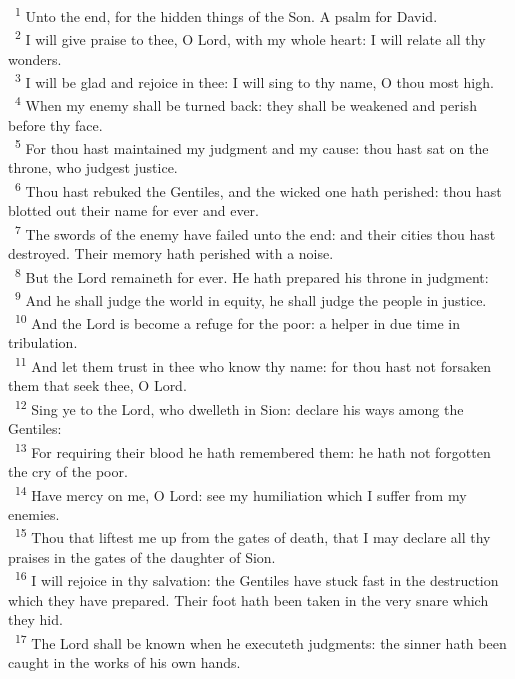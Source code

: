 \documentclass[a5paper,12pt]{article}
\begin{document}
\begin{multicols*}{2}
~\textsuperscript{1} Unto the end, for the hidden things of the Son. A psalm for David.\\
~\textsuperscript{2} I will give praise to thee, O Lord, with my whole heart: I will relate all thy wonders.\\
~\textsuperscript{3} I will be glad and rejoice in thee: I will sing to thy name, O thou most high.\\
~\textsuperscript{4} When my enemy shall be turned back: they shall be weakened and perish before thy face.\\
~\textsuperscript{5} For thou hast maintained my judgment and my cause: thou hast sat on the throne, who judgest justice.\\
~\textsuperscript{6} Thou hast rebuked the Gentiles, and the wicked one hath perished: thou hast blotted out their name for ever and ever.\\
~\textsuperscript{7} The swords of the enemy have failed unto the end: and their cities thou hast destroyed. Their memory hath perished with a noise.\\
~\textsuperscript{8} But the Lord remaineth for ever. He hath prepared his throne in judgment:\\
~\textsuperscript{9} And he shall judge the world in equity, he shall judge the people in justice.\\
~\textsuperscript{10} And the Lord is become a refuge for the poor: a helper in due time in tribulation.\\
~\textsuperscript{11} And let them trust in thee who know thy name: for thou hast not forsaken them that seek thee, O Lord.\\
~\textsuperscript{12} Sing ye to the Lord, who dwelleth in Sion: declare his ways among the Gentiles:\\
~\textsuperscript{13} For requiring their blood he hath remembered them: he hath not forgotten the cry of the poor.\\
~\textsuperscript{14} Have mercy on me, O Lord: see my humiliation which I suffer from my enemies.\\
~\textsuperscript{15} Thou that liftest me up from the gates of death, that I may declare all thy praises in the gates of the daughter of Sion.\\
~\textsuperscript{16} I will rejoice in thy salvation: the Gentiles have stuck fast in the destruction which they have prepared. Their foot hath been taken in the very snare which they hid.\\
~\textsuperscript{17} The Lord shall be known when he executeth judgments: the sinner hath been caught in the works of his own hands.\\

\end{multicols*}
\end{document}
